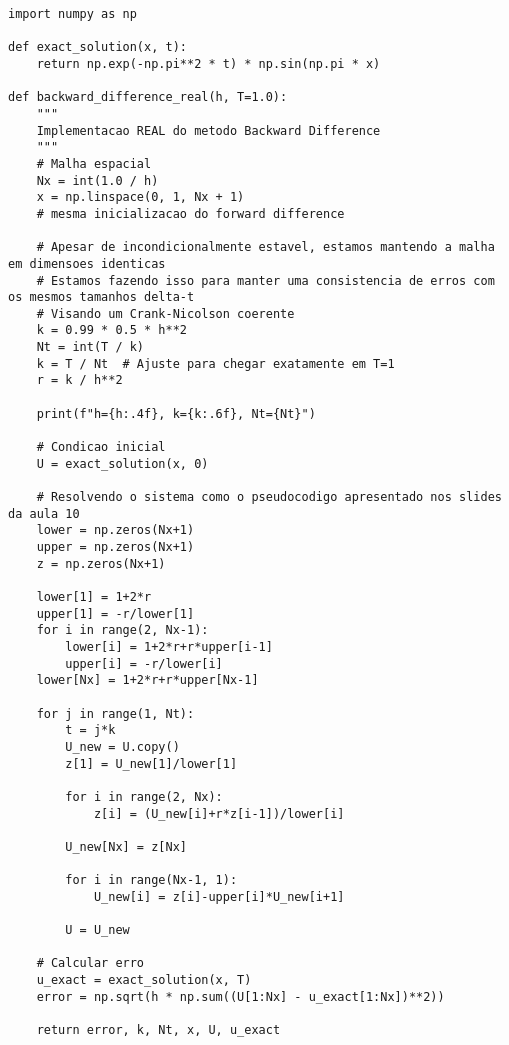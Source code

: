 \documentclass[10pt,twocolumn]{article}
\begin{document}
\begin{verbatim}
import numpy as np

def exact_solution(x, t):
    return np.exp(-np.pi**2 * t) * np.sin(np.pi * x)

def backward_difference_real(h, T=1.0):
    """
    Implementacao REAL do metodo Backward Difference
    """
    # Malha espacial
    Nx = int(1.0 / h)
    x = np.linspace(0, 1, Nx + 1)
    # mesma inicializacao do forward difference

    # Apesar de incondicionalmente estavel, estamos mantendo a malha em dimensoes identicas
    # Estamos fazendo isso para manter uma consistencia de erros com os mesmos tamanhos delta-t
    # Visando um Crank-Nicolson coerente
    k = 0.99 * 0.5 * h**2
    Nt = int(T / k)
    k = T / Nt  # Ajuste para chegar exatamente em T=1
    r = k / h**2

    print(f"h={h:.4f}, k={k:.6f}, Nt={Nt}")

    # Condicao inicial
    U = exact_solution(x, 0)

    # Resolvendo o sistema como o pseudocodigo apresentado nos slides da aula 10
    lower = np.zeros(Nx+1)
    upper = np.zeros(Nx+1)
    z = np.zeros(Nx+1)

    lower[1] = 1+2*r
    upper[1] = -r/lower[1]
    for i in range(2, Nx-1):
        lower[i] = 1+2*r+r*upper[i-1]
        upper[i] = -r/lower[i]
    lower[Nx] = 1+2*r+r*upper[Nx-1]

    for j in range(1, Nt):
        t = j*k
        U_new = U.copy()
        z[1] = U_new[1]/lower[1]

        for i in range(2, Nx):
            z[i] = (U_new[i]+r*z[i-1])/lower[i]

        U_new[Nx] = z[Nx]

        for i in range(Nx-1, 1):
            U_new[i] = z[i]-upper[i]*U_new[i+1]

        U = U_new

    # Calcular erro
    u_exact = exact_solution(x, T)
    error = np.sqrt(h * np.sum((U[1:Nx] - u_exact[1:Nx])**2))

    return error, k, Nt, x, U, u_exact
\end{verbatim}
\end{document}
